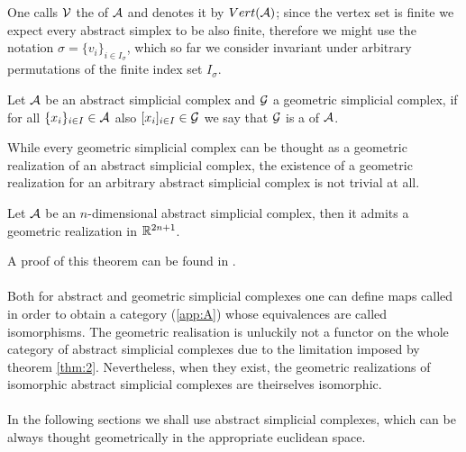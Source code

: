 \documentclass[../1.tex]{subfiles}
\begin{document}
    One calls $\mathcal{V}$ the  of $\mathcal{A}$ and denotes it by $Vert(\mathcal{A})$; since the vertex
    set is finite we expect every abstract simplex to be also finite, therefore we might use the notation $\sigma = \{ v_i \}_{i \in I_\sigma}$,
    which so far we consider invariant under arbitrary permutations of the finite index set $I_\sigma$.
    
    \begin{defn}
        Let $\mathcal{A}$ be an abstract simplicial complex and $\mathcal{G}$ a geometric simplicial complex, if for all $\{x_i\}_{i \in I} \in \mathcal{A}$ also $[x_i]_{i \in I} \in \mathcal{G}$
        we say that $\mathcal{G}$ is a  of $\mathcal{A}$.
    \end{defn}

    While every geometric simplicial complex can be thought as a geometric realization of an abstract simplicial complex, the existence of a geometric 
    realization for an arbitrary abstract simplicial complex is not trivial at all.

    \begin{thm}
        \label{thm:2}
        Let $\mathcal{A}$ be an $n$-dimensional abstract simplicial complex, then it admits a geometric realization in $\mathbb{R}^{2n+1}$.
    \end{thm}

    A proof of this theorem can be found in \cite{comptop}.\\
    \hfill \\
    Both for abstract and geometric simplicial complexes one can define maps called  in order to obtain a category (\ref{app:A}) whose
    equivalences are called isomorphisms. The geometric realisation is unluckily not a functor on the whole category of abstract simplicial complexes due to the
    limitation imposed by theorem \ref{thm:2}. Nevertheless, when they exist, the geometric realizations of isomorphic abstract simplicial complexes are theirselves isomorphic.\\
    \hfill \\
    In the following sections we shall use abstract simplicial complexes, which can be always thought geometrically in the appropriate euclidean space.
\end{document}

